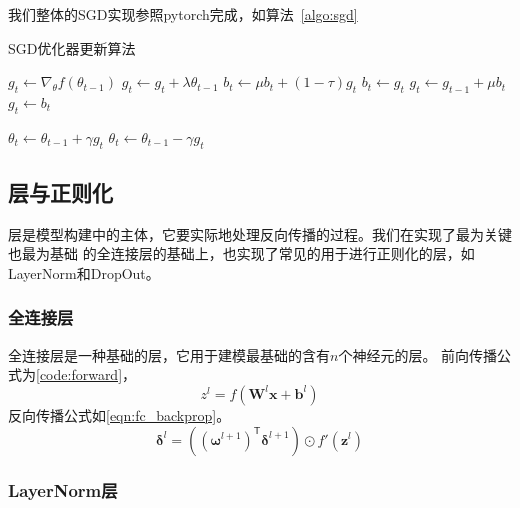 \documentclass[a4paper,twoside,twocolumn]{article}
\begin{document}
\begin{spacing}{1.2}
我们整体的SGD实现参照pytorch完成，如算法~\ref{algo:sgd}
\begin{algorithm}[htbp]
	\caption{SGD优化器更新算法}
	\label{algo:sgd}
	\begin{algorithmic}[1]
		
		\State $g_t\gets\nabla_\theta f(\theta_{t-1})$
		\State $g_t\gets g_t+\lambda \theta_{t-1}$
		\EndIf
		\State $b_t\gets \mu b_t+(1-\tau)g_t$
		\Else
		\State $b_t\gets g_t$
		\EndIf
		\State $g_t\gets g_{t-1}+\mu b_t$
		\Else
		\State $g_t\gets b_t$
		\EndIf
		\EndIf

		\State $\theta_t\gets\theta_{t-1}+\gamma g_t$
		\Else
		\State $\theta_t\gets\theta_{t-1}-\gamma g_t$
		\EndIf
		\EndFor
	\end{algorithmic}
\end{algorithm}	

\subsection{层与正则化}

层是模型构建中的主体，它要实际地处理反向传播的过程。我们在实现了最为关键也最为基础
的全连接层的基础上，也实现了常见的用于进行正则化的层，如LayerNorm和DropOut。

\subsubsection{全连接层}

全连接层是一种基础的层，它用于建模最基础的含有$n$个神经元的层。
前向传播公式为\eqref{code:forward}，
\begin{equation}
	\label{eqn:forward}
	z^l=f(\boldsymbol{W}^l\boldsymbol{x}+\boldsymbol{b}^l)
\end{equation}
反向传播公式如\eqref{eqn:fc_backprop}。
\begin{equation}
	\label{eqn:fc_backprop}
	\boldsymbol{\delta}^l=((\boldsymbol{\omega}^{l+1})^\mathsf{T}\boldsymbol{\delta}^{l+1})\odot f'(\boldsymbol{z}^{l})
\end{equation}

\subsubsection{LayerNorm层}


\end{spacing}
\end{document}
